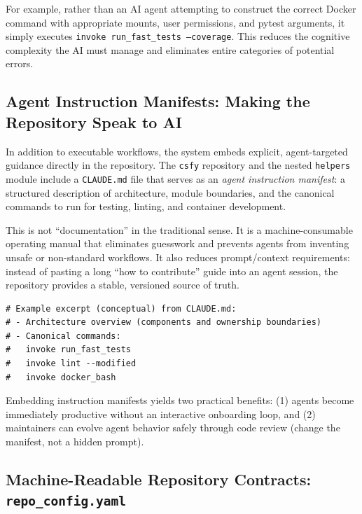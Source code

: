 For example, rather than an AI agent attempting to construct the correct
Docker command with appropriate mounts, user permissions, and pytest
arguments, it simply executes \texttt{invoke run\_fast\_tests --coverage}.
This reduces the cognitive complexity the AI must manage and eliminates
entire categories of potential errors.

\subsection{Agent Instruction Manifests: Making the Repository Speak to AI}

In addition to executable workflows, the system embeds explicit, agent-targeted
guidance directly in the repository. The \texttt{csfy} repository and the nested
\texttt{helpers} module include a \texttt{CLAUDE.md} file that serves as an
\emph{agent instruction manifest}: a structured description of architecture,
module boundaries, and the canonical commands to run for testing, linting, and
container development.

This is not “documentation” in the traditional sense. It is a machine-consumable
operating manual that eliminates guesswork and prevents agents from inventing
unsafe or non-standard workflows. It also reduces prompt/context requirements:
instead of pasting a long “how to contribute” guide into an agent session, the
repository provides a stable, versioned source of truth.

\begin{lstlisting}[language=Text]
# Example excerpt (conceptual) from CLAUDE.md:
# - Architecture overview (components and ownership boundaries)
# - Canonical commands:
#   invoke run_fast_tests
#   invoke lint --modified
#   invoke docker_bash
\end{lstlisting}

Embedding instruction manifests yields two practical benefits:
(1) agents become immediately productive without an interactive onboarding loop,
and (2) maintainers can evolve agent behavior safely through code review
(change the manifest, not a hidden prompt).

\subsection{Machine-Readable Repository Contracts: \texttt{repo\_config.yaml}}


